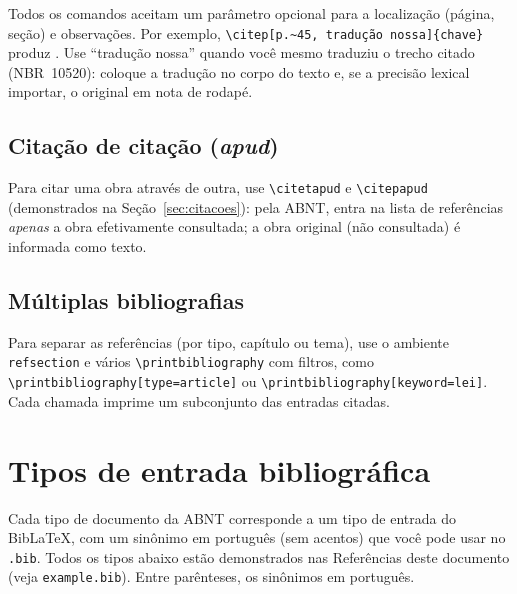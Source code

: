 \documentclass[dsc,pdfa]{coppe}
\begin{document}
  Todos os comandos aceitam um parâmetro opcional para a localização (página, seção) e observações. Por exemplo, \verb|\citep[p.~45, tradução nossa]{chave}| produz \citep[p.~45, tradução nossa]{article-example}. Use ``tradução nossa'' quando você mesmo traduziu o trecho citado (NBR~10520): coloque a tradução no corpo do texto e, se a precisão lexical importar, o original em nota de rodapé.

  \subsection{Citação de citação (\emph{apud})}

  Para citar uma obra através de outra, use \verb|\citetapud| e \verb|\citepapud| (demonstrados na Seção~\ref{sec:citacoes}): pela ABNT, entra na lista de referências \emph{apenas} a obra efetivamente consultada; a obra original (não consultada) é informada como texto.

  \subsection{Múltiplas bibliografias}

  Para separar as referências (por tipo, capítulo ou tema), use o ambiente \verb|refsection| e vários \verb|\printbibliography| com filtros, como \verb|\printbibliography[type=article]| ou \verb|\printbibliography[keyword=lei]|. Cada chamada imprime um subconjunto das entradas citadas.

  \section{Tipos de entrada bibliográfica}

  Cada tipo de documento da ABNT corresponde a um tipo de entrada do BibLaTeX, com um sinônimo em português (sem acentos) que você pode usar no \texttt{.bib}. Todos os tipos abaixo estão demonstrados nas Referências deste documento (veja \texttt{example.bib}). Entre parênteses, os sinônimos em português.

  \begingroup\raggedright
\end{document}
